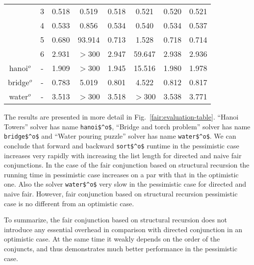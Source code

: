 \begin{figure*}
\begin{tabular}{ c | c | c | c | c | c | c | c }
                 & 3    & 0.518 &  0.519 & 0.518 & 0.521  & 0.520 & 0.521 \\
                 & 4    & 0.533 &  0.856 & 0.534 & 0.540  & 0.534 & 0.537 \\
                 & 5    & 0.680 & 93.914 & 0.713 & 1.528  & 0.718 & 0.714 \\
                 & 6    & 2.931 & $>$300 & 2.947 & 59.647 & 2.938 & 2.936 \\
    \hline
    hanoi$^o$    & -    & 1.909 & $>$300 & 1.945 & 15.516 & 1.980 & 1.978 \\
    \hline
    bridge$^o$   & -    & 0.783 & 5.019  & 0.801 & 4.522  & 0.812 & 0.817 \\
    \hline
    water$^o$    & -    & 3.513 & $>$300 & 3.518 & $>$300 & 3.538 & 3.771

  \end{tabular}
  \caption{The results of evaluation: running times of benchmarks in seconds}
  \label{fair:evaluation-table}
\end{figure*}

The results are presented in more detail in Fig.~\ref{fair:evaluation-table}. ``Hanoi Towers'' solver has name \lstinline{hanoi$^o$}, ``Bridge and torch problem'' solver has name \lstinline{bridge$^o$} and ``Water pouring puzzle'' solver has name \lstinline{water$^o$}. We can conclude that forward and backward \lstinline{sort$^o$} runtime in the pessimistic case increases very rapidly with increasing the list length for directed and naive fair conjunctions. In the case of the fair conjunction based on structural recursion the running time in pessimistic case increases on a par with that in the optimistic one. Also  the solver \lstinline{water$^o$} very slow in the pessimistic case for directed and naive fair. However, fair conjunction based on structural recursion pessimistic case is no different from an optimistic case.


To summarize, the fair conjunction based on structural recursion does not introduce any essential overhead in comparison with directed conjunction in an optimistic case. At the same time it
weakly depends on the order of the conjuncts, and thus demonstrates much better performance in the pessimistic case.
